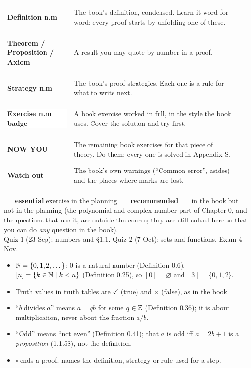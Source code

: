 \begin{center}\sffamily\small
\begin{tabular}{@{}p{0.27\linewidth}p{0.68\linewidth}@{}}
\colorbox{hyellow}{\strut\textbf{Definition n.m}} & The book's definition, condensed. Learn it word for word: every proof starts by unfolding one of these.\\[3pt]
\colorbox{hlight}{\strut\textbf{Theorem / Proposition / Axiom}} & A result you may quote by number in a proof.\\[3pt]
\colorbox{hgreen}{\strut\textbf{Strategy n.m}} & The book's proof strategies. Each one is a rule for what to write next.\\[3pt]
\colorbox{white}{\strut\textcolor{hblue}{\textbf{Exercise n.m}} \textcolor{horange}{\textbf{badge}}} & A book exercise worked in full, in the style the book uses. Cover the solution and try first.\\[3pt]
\colorbox{hpurplebg}{\strut\textbf{NOW YOU}} & The remaining book exercises for that piece of theory. Do them; every one is solved in Appendix S.\\[3pt]
\colorbox{hredbg}{\strut\textbf{Watch out}} & The book's own warnings (``Common error'', asides) and the places where marks are lost.
\end{tabular}
\end{center}

\begin{key}
\fE\ = \textbf{essential} exercise in the planning \quad \fR\ = \textbf{recommended} \quad \fO\ = in the book but not in the planning (the polynomial and complex-number part of Chapter 0, and the questions that use it, are outside the course; they are still solved here so that you can do \emph{any} question in the book).\\[3pt]
Quiz 1 (23 Sep): numbers and \S1.1. \quad Quiz 2 (7 Oct): sets and functions. \quad Exam 4 Nov.
\end{key}

\begin{key}
\begin{itemize}
\item $\mathbb{N}=\{0,1,2,\dots\}$: $0$ is a natural number (Definition 0.6). $[n]=\{k\in\mathbb{N}\mid k<n\}$ (Definition 0.25), so $[0]=\varnothing$ and $[3]=\{0,1,2\}$.
\item Truth values in truth tables are $\checkmark$ (true) and $\times$ (false), as in the book.
\item ``$b$ divides $a$'' means $a=qb$ for some $q\in\mathbb{Z}$ (Definition 0.36); it is about multiplication, never about the fraction $a/b$.
\item ``Odd'' means ``not even'' (Definition 0.41); that $a$ is odd iff $a=2b+1$ is a \emph{proposition} (1.1.58), not the definition.
\item $\square$ ends a proof.  names the definition, strategy or rule used for a step.
\end{itemize}
\end{key}
